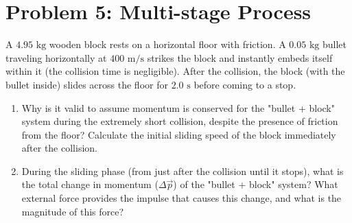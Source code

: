 \documentclass{article}
\begin{document}
\section*{Problem 5: Multi-stage Process}
A $4.95 \text{ kg}$ wooden block rests on a horizontal floor with friction. A $0.05 \text{ kg}$ bullet traveling horizontally at $400 \text{ m/s}$ strikes the block and instantly embeds itself within it (the collision time is negligible). After the collision, the block (with the bullet inside) slides across the floor for $2.0 \text{ s}$ before coming to a stop.
\begin{enumerate}[label=(\alph*)]
    \item Why is it valid to assume momentum is conserved for the "bullet + block" system during the extremely short collision, despite the presence of friction from the floor? Calculate the initial sliding speed of the block immediately after the collision.
    \item During the sliding phase (from just after the collision until it stops), what is the total change in momentum ($\Delta \vec{p}$) of the "bullet + block" system? What external force provides the impulse that causes this change, and what is the magnitude of this force?
\end{enumerate}
\vspace{4cm}
\end{document}
